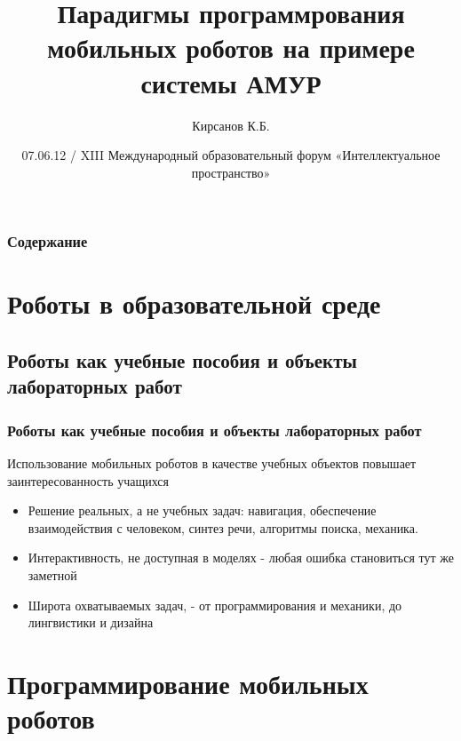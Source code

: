 \documentclass{beamer}
\title{Парадигмы программрования мобильных роботов на примере системы АМУР}
\author{Кирсанов К.Б.}
\institute[sensorika]
{Международная Лаборатория Сенсорика}
\date{07.06.12 / XIII Международный образовательный форум
«Интеллектуальное пространство»}
\begin{document}
\begin{frame}
\titlepage
\end{frame}

\begin{frame}
\frametitle{Содержание}
\tableofcontents
\end{frame}

\section{Роботы в образовательной среде}
\subsection{Роботы как учебные пособия и объекты лабораторных работ}
\begin{frame}
\frametitle{Роботы как учебные пособия и объекты лабораторных работ}
Использование мобильных роботов в качестве учебных объектов повышает
заинтересованность учащихся
\\
\begin{itemize}
  \item<1> Решение реальных, а не учебных задач: навигация, обеспечение
  взаимодействия с человеком, синтез речи, алгоритмы поиска, механика.
  \item<1> Интерактивность, не доступная в моделях - любая ошибка становиться тут
  же заметной
  \item<1> Широта охватываемых задач, - от программирования и механики, до
  лингвистики и дизайна
\end{itemize}
\end{frame}

\section{Программирование мобильных роботов}
\end{document}
